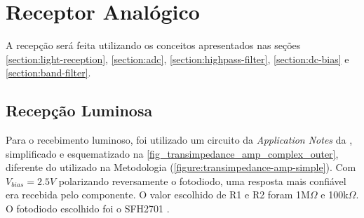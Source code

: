 	\section{Receptor Analógico}

	A recepção será feita utilizando os conceitos apresentados nas seções \ref{section:light-reception}, \ref{section:adc},  \ref{section:highpass-filter}, \ref{section:dc-bias} e \ref{section:band-filter}.

	\subsection{Recepção Luminosa}
	Para o recebimento luminoso, foi utilizado um circuito da \emph{Application Notes} da \cite{datasheet-opa380}, simplificado e esquematizado na \autoref{fig_transimpedance_amp_complex_outer}, diferente do utilizado na Metodologia (\autoref{figure:transimpedance-amp-simple}). Com $V_{bias} = 2.5V$ polarizando reversamente o fotodiodo, uma resposta mais confiável era recebida pelo componente. O valor escolhido de R1 e R2 foram  1M$\Omega$ e 100k$\Omega$. O fotodiodo escolhido foi o SFH2701 \cite{datasheet-sfh2701} .

